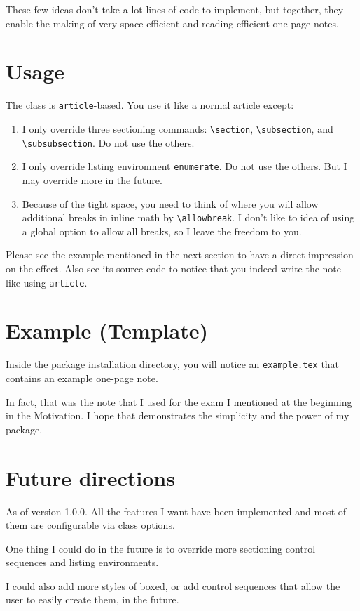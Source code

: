 \documentclass{article}
\begin{document}
These few ideas don't take a lot lines of code to implement, but together, they
enable the making of very space-efficient and reading-efficient one-page notes.

\section{Usage}
The class is \verb!article!-based. You use it like a normal article except:
\begin{enumerate}
	\item I only override three sectioning commands: \verb|\section|,
	\verb|\subsection|, and \verb|\subsubsection|. Do not use the others.
	\item I only override listing environment \verb|enumerate|. Do not use the
		others. But I may override more in the future.
	\item Because of the tight space, you need to think of where you will allow
		additional breaks in inline math by \verb|\allowbreak|. I don't like to
		idea of using a global option to allow all breaks, so I leave the
		freedom to you.
\end{enumerate}

Please see the example mentioned in the next section to have a direct impression
on the effect. Also see its source code to notice that you indeed write the note
like using \verb|article|.

\section{Example (Template)}
Inside the package installation directory, you will notice an
\texttt{example.tex} that contains an example one-page note.

In fact, that was the note that I used for the exam I mentioned at the beginning
in the Motivation. I hope that demonstrates the simplicity and the power of my
package.

\section{Future directions}
As of version 1.0.0. All the features I want have been implemented and most of
them are configurable via class options.

One thing I could do in the future is to override more sectioning control
sequences and listing environments.

I could also add more styles of boxed, or add control sequences that allow the
user to easily create them, in the future.
\end{document}
